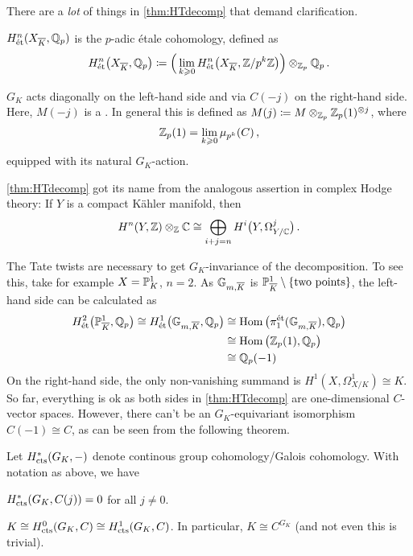 \begin{rem}\label{rem:HTdecomp}
	There are a \emph{lot} of things in \cref{thm:HTdecomp} that demand clarification.
	\begin{numerate}
		\item $H_\et^n(X_{\ov{K}},\IQ_p)$ is the $p$-adic étale cohomology, defined as
		\begin{equation*}
			H_\et^n\big(X_{\ov{K}},\IQ_p\big)\coloneqq \Big(\lim_{k\geq 0} H_{\et}^n\big(X_{\ov{K}},\IZ/p^k\IZ\big)\Big)\otimes_{\IZ_p}\IQ_p\,.
		\end{equation*}
		\item $G_K$ acts diagonally on the left-hand side and via $C(-j)$ on the right-hand side. Here, $M(-j)$ is a . In general this is defined as $M(j)\coloneqq M\otimes_{\mathbb{Z}_p}\mathbb{Z}_p(1)^{\otimes j}$, where
		\begin{equation*}
			\mathbb{Z}_p(1)=\lim_{k\geqslant 0}\mu_{p^k}(C)\,,
		\end{equation*}
		equipped with its natural $G_K$-action.
		\item \cref{thm:HTdecomp} got its name from the analogous assertion in complex Hodge theory: If $Y$ is a compact Kähler manifold, then
		\begin{equation*}
			H^n(Y,\mathbb{Z})\otimes_{\mathbb{Z}}\mathbb{C}\cong\bigoplus_{i+j=n}H^i\big(Y,\Omega_{Y/\mathbb{C}}^j\big)\,.
		\end{equation*}
		\item The Tate twists are necessary to get $G_K$-invariance of the decomposition. To see this, take for example $X=\mathbb{P}_K^1$, $n=2$. As $\IG_{m,\ov{K}}$ is $\IP_{\ov{K}}^1\setminus\{\text{two points}\}$, the left-hand side can be calculated as
		\begin{align*}
			H_\et^2\big(\IP_{\ov{K}}^1,\IQ_p\big)\cong H_\et^1\big(\IG_{m,\ov{K}},\IQ_p\big)&\cong \Hom\big(\pi_1^\et(\IG_{m,\ov{K}}),\IQ_p\big)\\
			&\cong \Hom\big(\IZ_p(1),\IQ_p\big)\\
			&\cong \IQ_p(-1)
		\end{align*}
		On the right-hand side, the only non-vanishing summand is $H^1(X,\Omega_{X/K}^1)\cong K$. So far, everything is ok as both sides in \cref{thm:HTdecomp} are one-dimensional $C$-vector spaces. However, there can't be an $G_K$-equivariant isomorphism $C(-1)\cong C$, as can be seen from the following theorem. 
	\end{numerate}
\end{rem}
\begin{thm}[Tate]
	Let $H_{\mathrm{cts}}^*(G_K,-)$ denote continous group cohomology/Galois cohomology. With notation as above, we have
	\begin{numerate}
		\item $H_{\mathrm{cts}}^*(G_K,C(j))=0$ for all $j\neq 0$.
		\item $K\cong H_{\mathrm{cts}}^0(G_K,C)\cong H_{\mathrm{cts}}^1(G_K,C)$. In particular, $K\cong C^{G_K}$ (and not even this is trivial).
	\end{numerate}
\end{thm}
